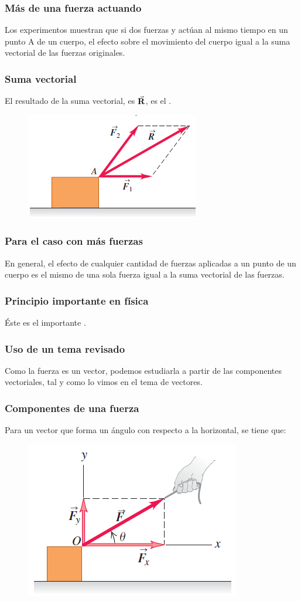 \documentclass[14pt]{beamer}
\begin{document}
\begin{frame}
\frametitle{Más de una fuerza actuando}
Los experimentos muestran que si dos fuerzas y actúan al mismo tiempo en un punto A de un cuerpo, \pause el efecto sobre el movimiento del cuerpo  igual a la suma vectorial de las fuerzas originales.
\end{frame}
\begin{frame}
\frametitle{Suma vectorial}
El resultado de la suma vectorial, es $\va{R}$, \pause es el .
\pause
\begin{figure}
    \centering
    \includegraphics[scale=0.8]{Imagenes/Fuerza_06.png}
\end{figure}
\end{frame}
\begin{frame}
\frametitle{Para el caso con más fuerzas}
En general, el efecto de cualquier cantidad de fuerzas aplicadas a un punto de un cuerpo es el mismo de una sola fuerza igual a la suma vectorial de las fuerzas.
\end{frame}
\begin{frame}
\frametitle{Principio importante en física}
Éste es el importante .
\end{frame}
\begin{frame}
\frametitle{Uso de un tema revisado}
Como la fuerza es un vector, podemos estudiarla a partir de las componentes vectoriales, \pause tal y como lo vimos en el tema de vectores.
\end{frame}
\begin{frame}
\frametitle{Componentes de una fuerza}
Para un vector que forma un ángulo con respecto a la horizontal, se tiene que:
\pause
\begin{figure}
    \centering
    \includegraphics[scale=0.7]{Imagenes/Fuerza_07.png}
\end{figure}
\end{frame}
\end{document}
